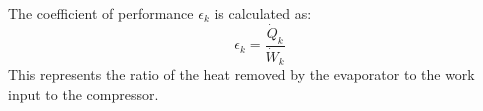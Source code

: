 The coefficient of performance \( \epsilon_k \) is calculated as:  
\[
\epsilon_k = \frac{\dot{Q}_k}{\dot{W}_k}
\]  
This represents the ratio of the heat removed by the evaporator to the work input to the compressor.